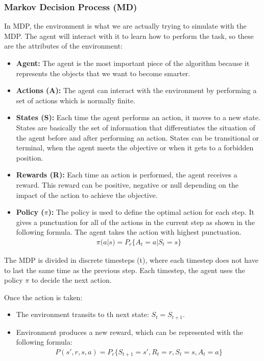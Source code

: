 		\subsubsection{Markov Decision Process (MD)}
			In MDP, the environment is what we are actually trying to simulate with the MDP. The agent will interact with it to learn how to perform the task, so these are the attributes of the environment:
			\begin{itemize}
				\item[\textendash]\textbf{Agent:} The agent is the most important piece of the algorithm because it represents the objects that we want to become smarter.
				\item[\textendash]\textbf{Actions (A):} The agent can interact with the environment by performing a set of actions which is normally finite.
				\item[\textendash]\textbf{States (S): } Each time the agent performs an action, it moves to a new state. States are basically the set of information that differentiates the situation of the agent before and after performing an action. States can be transitional or terminal, when the agent meets the objective or when it gets to a forbidden position.
				\item[\textendash]\textbf{Rewards (R):} Each time an action is performed, the agent receives a reward. This reward can be positive, negative or null depending on the impact of the action to achieve the objective.
				\item[\textendash]\textbf{Policy ($\pi$):} The policy is used to define the optimal action for each step. It gives a punctuation for all of the actions in the current step as shown in the following formula. The agent takes the action with highest punctuation.
				\begin{gather*}
					\pi(a|s)=P_r\{A_t=a|S_t=s\}
				\end{gather*}
			
			\end{itemize}
			
			The MDP is divided in discrete timesteps (t), where each timestep does not have to last the same time as the previous step. Each timestep, the agent uses the policy $\pi$ to decide the next action. 
			
			Once the action is taken:
			\begin{itemize}
				\item[\textendash]The environment transits to th next state: \textbf{ \boldmath$S_t = S_{t+1}$}.
				\item[\textendash] Environment produces a new reward, which can be represented with the following formula: \boldmath
				\begin{gather*}
					P(s', r, s, a) = P_{r}\{S_{t+1}=s', R_t=r, S_{t}=s, A_{t}=a\}
				\end{gather*}
			\end{itemize}
			
